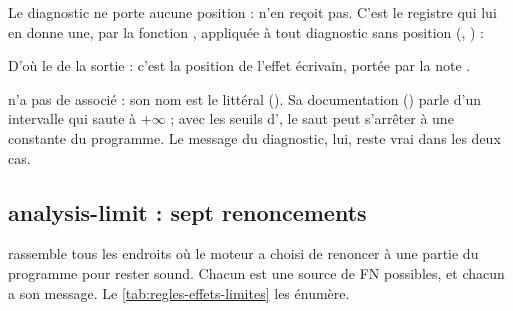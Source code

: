 Le diagnostic ne porte aucune position :  n'en reçoit pas. C'est le registre qui lui en donne une, par la fonction , appliquée à tout diagnostic sans position (, ) :


D'où le  de la sortie : c'est la position de l'effet écrivain, portée par la note .

\begin{remarque}
 n'a pas de  associé : son nom est le littéral  (). Sa documentation () parle d'un intervalle qui \og saute à $+\infty$\fg{} ; avec les seuils d', le saut peut s'arrêter à une constante du programme. Le message du diagnostic, lui, reste vrai dans les deux cas.
\end{remarque}

\subsection{analysis-limit : sept renoncements}

 rassemble tous les endroits où le moteur a choisi de renoncer à une partie du programme pour rester sound. Chacun est une source de FN possibles, et chacun a son message. Le \cref{tab:regles-effets-limites} les énumère.


